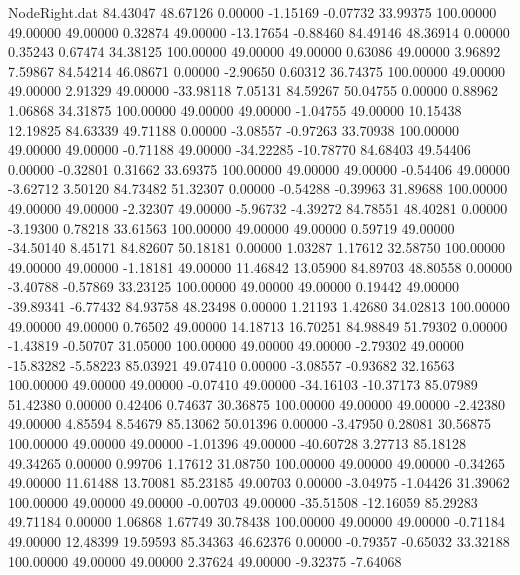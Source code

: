 \begin{filecontents}{NodeRight.dat}
  84.43047   48.67126    0.00000    -1.15169   -0.07732   33.99375  100.00000   49.00000   49.00000    0.32874   49.00000  -13.17654   -0.88460
  84.49146   48.36914    0.00000     0.35243    0.67474   34.38125  100.00000   49.00000   49.00000    0.63086   49.00000    3.96892    7.59867
  84.54214   46.08671    0.00000    -2.90650    0.60312   36.74375  100.00000   49.00000   49.00000    2.91329   49.00000  -33.98118    7.05131
  84.59267   50.04755    0.00000     0.88962    1.06868   34.31875  100.00000   49.00000   49.00000   -1.04755   49.00000   10.15438   12.19825
  84.63339   49.71188    0.00000    -3.08557   -0.97263   33.70938  100.00000   49.00000   49.00000   -0.71188   49.00000  -34.22285  -10.78770
  84.68403   49.54406    0.00000    -0.32801    0.31662   33.69375  100.00000   49.00000   49.00000   -0.54406   49.00000   -3.62712    3.50120
  84.73482   51.32307    0.00000    -0.54288   -0.39963   31.89688  100.00000   49.00000   49.00000   -2.32307   49.00000   -5.96732   -4.39272
  84.78551   48.40281    0.00000    -3.19300    0.78218   33.61563  100.00000   49.00000   49.00000    0.59719   49.00000  -34.50140    8.45171
  84.82607   50.18181    0.00000     1.03287    1.17612   32.58750  100.00000   49.00000   49.00000   -1.18181   49.00000   11.46842   13.05900
  84.89703   48.80558    0.00000    -3.40788   -0.57869   33.23125  100.00000   49.00000   49.00000    0.19442   49.00000  -39.89341   -6.77432
  84.93758   48.23498    0.00000     1.21193    1.42680   34.02813  100.00000   49.00000   49.00000    0.76502   49.00000   14.18713   16.70251
  84.98849   51.79302    0.00000    -1.43819   -0.50707   31.05000  100.00000   49.00000   49.00000   -2.79302   49.00000  -15.83282   -5.58223
  85.03921   49.07410    0.00000    -3.08557   -0.93682   32.16563  100.00000   49.00000   49.00000   -0.07410   49.00000  -34.16103  -10.37173
  85.07989   51.42380    0.00000     0.42406    0.74637   30.36875  100.00000   49.00000   49.00000   -2.42380   49.00000    4.85594    8.54679
  85.13062   50.01396    0.00000    -3.47950    0.28081   30.56875  100.00000   49.00000   49.00000   -1.01396   49.00000  -40.60728    3.27713
  85.18128   49.34265    0.00000     0.99706    1.17612   31.08750  100.00000   49.00000   49.00000   -0.34265   49.00000   11.61488   13.70081
  85.23185   49.00703    0.00000    -3.04975   -1.04426   31.39062  100.00000   49.00000   49.00000   -0.00703   49.00000  -35.51508  -12.16059
  85.29283   49.71184    0.00000     1.06868    1.67749   30.78438  100.00000   49.00000   49.00000   -0.71184   49.00000   12.48399   19.59593
  85.34363   46.62376    0.00000    -0.79357   -0.65032   33.32188  100.00000   49.00000   49.00000    2.37624   49.00000   -9.32375   -7.64068

\end{filecontents}
